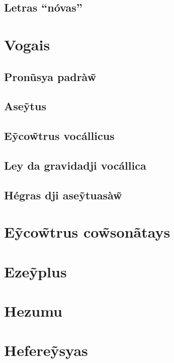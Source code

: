 \documentclass[12pt, a4paper]{article}
\begin{document}
\begin{bilingualpages}
    \subsection{Letras ``nóvas''}
    
    \section{Vogais}
    \subsection{Pronũsya padrà\~w}
    \subsection{Ase\~ytus}
    \subsection{E\~yco\~wtrus vocállicus}
    \subsection{Ley da gravidadji vocállica}
    \subsection{Hégras dji ase\~ytuasà\~w}

    \section{E\~yco\~wtrus co\~wsonãtays}

    \section{Eze\~yplus}
    
\end{bilingualpages}

\newpage
\section{Hezumu}

\newpage
\section{Hefere\~ysyas}
\end{document}
